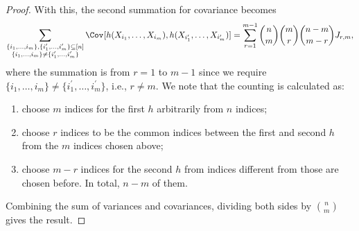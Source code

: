 \begin{proof}
	With this, the second summation for covariance becomes
	\[
		\sum_{\substack{\{ i_1, \dots , i_m \} , \{ i_1^{\prime} , \dots , i_m^{\prime} \} \subseteq [n] \\ \{ i_1 , \dots , i_m \} \neq \{ i_1^{\prime} , \dots , i_m^{\prime} \}}} \Cov_{}[h(X_{i_1}, \dots , X_{i_m}) , h(X_{i_1^{\prime} }, \dots , X_{i_m^{\prime} })]
		= \sum_{r=1}^{m-1} \binom{n}{m} \binom{m}{r} \binom{n-m}{m-r} J_{r, m},
	\]
	where the summation is from \(r = 1\) to \(m-1\) since we require \(\{ i_1 , \dots , i_m \} \neq \{ i_1^{\prime} , \dots , i_m^{\prime} \}\), i.e., \(r \neq m\). We note that the counting is calculated as:
	\begin{enumerate}
		\item choose \(m\) indices for the first \(h\) arbitrarily from \(n\) indices;
		\item choose \(r\) indices to be the common indices between the first and second \(h\) from the \(m\) indices chosen above;
		\item choose \(m-r\) indices for the second \(h\) from indices different from those are chosen before. In total, \(n-m\) of them.
	\end{enumerate}
	Combining the sum of variances and covariances, dividing both sides by \(\binom{n}{m}\) gives the result.
\end{proof}